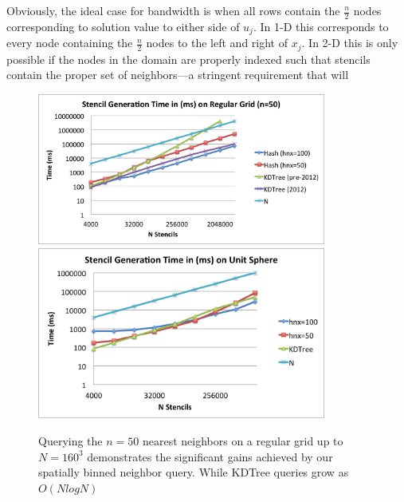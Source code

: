 \documentclass[11pt]{report}
\begin{document}


Obviously, the ideal case for bandwidth is when all rows contain the $\frac{n}{2}$ nodes corresponding to solution value to either side of $u_j$. In 1-D this corresponds to every node containing the $\frac{n}{2}$ nodes to the left and right of $x_j$. In 2-D this is only possible if the nodes in the domain are properly indexed such that stencils contain the proper set of neighbors---a stringent requirement that will 


\begin{figure}
\centering
\includegraphics[width=9.5cm]{../figures/stencils/kdtree_old_reg_subsets_4m_stencil_gen_time.png}
\includegraphics[width=9.5cm]{../figures/stencils/sphere_subsets_1m_stencil_gen_time.png}
\caption{Querying the $n=50$ nearest neighbors on a regular grid up to $N=160^3$ demonstrates the significant gains achieved by our spatially binned neighbor query. While KDTree queries grow as $O(N log N)$}
\label{fig:hash_results}
\end{figure}
\end{document}
